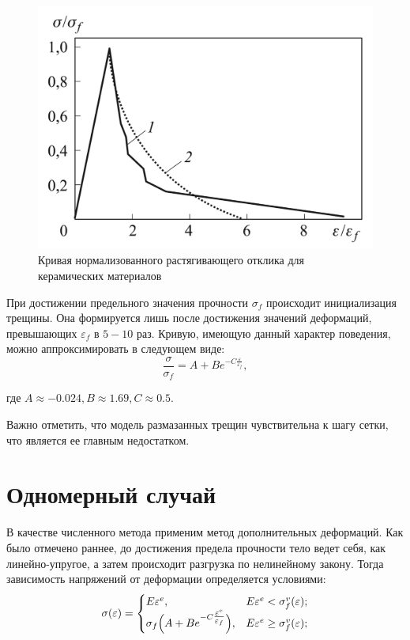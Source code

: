\documentclass[12pt,a4paper]{article}
\begin{document}
  \begin{figure}[h]
    \centering
    \includegraphics[width=\textwidth]{ceramic.jpeg}
    \caption{Кривая нормализованного растягивающего отклика для керамических материалов}
    \label{fig:ceramic}
  \end{figure}

  \pagebreak

  При достижении предельного значения прочности $\sigma_f$ происходит инициализация трещины. Она формируется лишь после достижения значений деформаций, превышающих $\varepsilon_f$ в $5-10$ раз. Кривую, имеющую данный характер поведения, можно аппроксимировать в следующем виде:
  \[
    \dfrac{\sigma}{\sigma_f} = A + B e^{-C\tfrac{\varepsilon}{\varepsilon_f}},
  \]

  \noindent где $A \approx -0.024, B \approx 1.69, C \approx 0.5$.
  
  Важно отметить, что модель размазанных трещин чувствительна к шагу сетки, что является ее главным недостатком.

  \section{Одномерный случай}

  В качестве численного метода применим метод дополнительных деформаций. Как было отмечено раннее, до достижения предела прочности тело ведет себя, как линейно-упругое, а затем происходит разгрузка по нелинейному закону. Тогда зависимость напряжений от деформации определяется условиями:
  \begin{equation}
    \sigma(\varepsilon) = 
    \begin{cases}
      E\varepsilon^e, & E\varepsilon^e < \sigma_f^v(\varepsilon); \\
      \sigma_f \Bigl( A + B e^{-C \tfrac{\varepsilon^e}{\varepsilon_f}} \Bigr), & E\varepsilon^e \geq \sigma_f^v(\varepsilon);
    \end{cases}
    \label{sigma}
  \end{equation}
\end{document}
